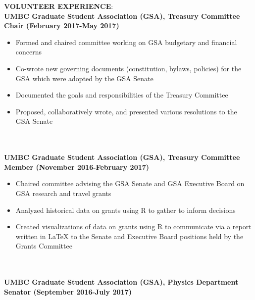 \documentclass{article}
\begin{document}
\noindent \textbf{VOLUNTEER EXPERIENCE}:\\
\noindent \textbf{UMBC Graduate Student Association (GSA), Treasury Committee Chair (February 2017-May 2017)}
\phantom \\
\begin{itemize}
\item Formed and chaired committee working on GSA budgetary and financial concerns
\item Co-wrote new governing documents (constitution, bylaws, policies) for the GSA which were adopted by the GSA Senate
\item Documented the goals and responsibilities of the Treasury Committee
\item Proposed, collaboratively wrote, and presented various resolutions to the GSA Senate
\end{itemize}
\phantom \\
\phantom \\
%
%
%
%
\noindent \textbf{UMBC Graduate Student Association (GSA), Treasury Committee Member (November 2016-February 2017)}
\phantom \\
\begin{itemize}
\item Chaired committee advising the GSA Senate and GSA Executive Board on GSA research and travel grants
\item Analyzed historical data on grants using R to gather to inform decisions
\item Created visualizations of data on grants using R to communicate via a report written in LaTeX to the Senate and Executive Board positions held by the Grants Committee
\end{itemize}
\phantom \\
\phantom \\
%
%
%
%
\noindent \textbf{UMBC Graduate Student Association (GSA), Physics Department Senator (September 2016-July 2017)}
\phantom \\
\end{document}
